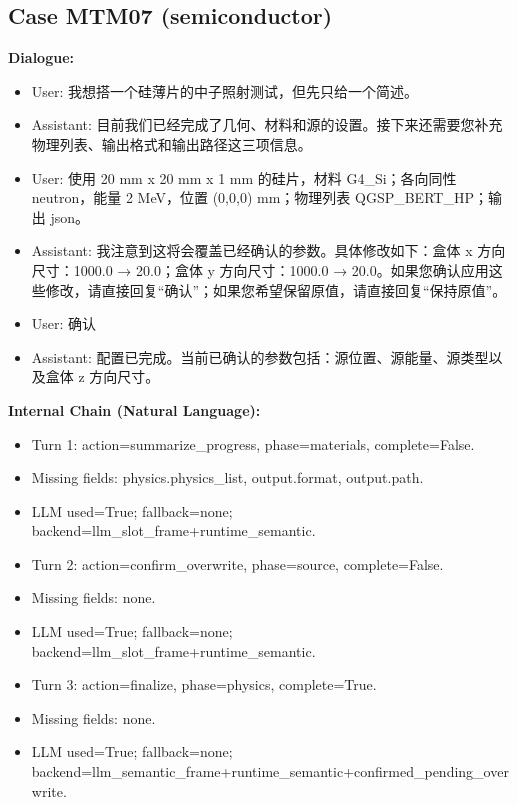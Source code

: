 \documentclass[11pt]{ctexart}
\begin{document}
\subsection{Case MTM07 (semiconductor)}
\textbf{Dialogue:}
\begin{itemize}
\item User: 我想搭一个硅薄片的中子照射测试，但先只给一个简述。
\item Assistant: 目前我们已经完成了几何、材料和源的设置。接下来还需要您补充物理列表、输出格式和输出路径这三项信息。
\item User: 使用 20 mm x 20 mm x 1 mm 的硅片，材料 G4\_Si；各向同性 neutron，能量 2 MeV，位置 (0,0,0) mm；物理列表 QGSP\_BERT\_HP；输出 json。
\item Assistant: 我注意到这将会覆盖已经确认的参数。具体修改如下：盒体 x 方向尺寸：1000.0 → 20.0；盒体 y 方向尺寸：1000.0 → 20.0。如果您确认应用这些修改，请直接回复“确认”；如果您希望保留原值，请直接回复“保持原值”。
\item User: 确认
\item Assistant: 配置已完成。当前已确认的参数包括：源位置、源能量、源类型以及盒体 z 方向尺寸。
\end{itemize}
\textbf{Internal Chain (Natural Language):}
\begin{itemize}
\item Turn 1: action=summarize\_progress, phase=materials, complete=False.
\item Missing fields: physics.physics\_list, output.format, output.path.
\item LLM used=True; fallback=none; backend=llm\_slot\_frame+runtime\_semantic.
\item Turn 2: action=confirm\_overwrite, phase=source, complete=False.
\item Missing fields: none.
\item LLM used=True; fallback=none; backend=llm\_slot\_frame+runtime\_semantic.
\item Turn 3: action=finalize, phase=physics, complete=True.
\item Missing fields: none.
\item LLM used=True; fallback=none; backend=llm\_semantic\_frame+runtime\_semantic+confirmed\_pending\_overwrite.
\end{itemize}
\end{document}
